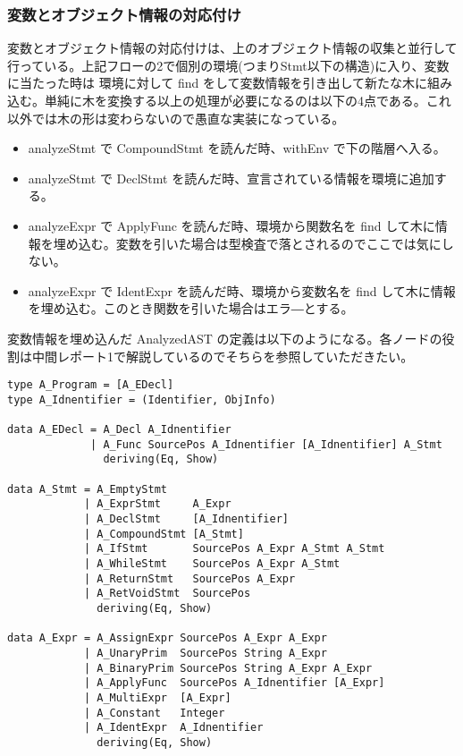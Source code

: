 \documentclass{jsarticle}
\begin{document}
\subsubsection{変数とオブジェクト情報の対応付け}
変数とオブジェクト情報の対応付けは、上のオブジェクト情報の収集と並行して行っている。上記フローの2で個別の環境(つまりStmt以下の構造)に入り、変数に当たった時は 環境に対して find をして変数情報を引き出して新たな木に組み込む。単純に木を変換する以上の処理が必要になるのは以下の4点である。これ以外では木の形は変わらないので愚直な実装になっている。
\begin{itemize}
\item analyzeStmt で CompoundStmt を読んだ時、withEnv で下の階層へ入る。
\item analyzeStmt で DeclStmt を読んだ時、宣言されている情報を環境に追加する。
\item analyzeExpr で ApplyFunc を読んだ時、環境から関数名を find して木に情報を埋め込む。変数を引いた場合は型検査で落とされるのでここでは気にしない。
\item analyzeExpr で IdentExpr を読んだ時、環境から変数名を find して木に情報を埋め込む。このとき関数を引いた場合はエラ―とする。\\
\end{itemize}
変数情報を埋め込んだ AnalyzedAST の定義は以下のようになる。各ノードの役割は中間レポート1で解説しているのでそちらを参照していただきたい。
\begin{verbatim}
type A_Program = [A_EDecl]
type A_Idnentifier = (Identifier, ObjInfo)

data A_EDecl = A_Decl A_Idnentifier
             | A_Func SourcePos A_Idnentifier [A_Idnentifier] A_Stmt
               deriving(Eq, Show)

data A_Stmt = A_EmptyStmt
            | A_ExprStmt     A_Expr
            | A_DeclStmt     [A_Idnentifier]
            | A_CompoundStmt [A_Stmt]
            | A_IfStmt       SourcePos A_Expr A_Stmt A_Stmt
            | A_WhileStmt    SourcePos A_Expr A_Stmt
            | A_ReturnStmt   SourcePos A_Expr
            | A_RetVoidStmt  SourcePos
              deriving(Eq, Show)

data A_Expr = A_AssignExpr SourcePos A_Expr A_Expr
            | A_UnaryPrim  SourcePos String A_Expr
            | A_BinaryPrim SourcePos String A_Expr A_Expr
            | A_ApplyFunc  SourcePos A_Idnentifier [A_Expr]
            | A_MultiExpr  [A_Expr]
            | A_Constant   Integer
            | A_IdentExpr  A_Idnentifier
              deriving(Eq, Show)
\end{verbatim}
\end{document}
